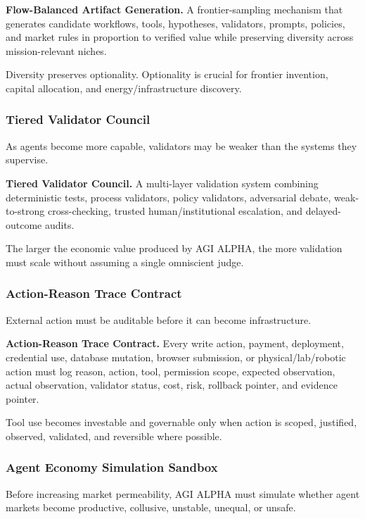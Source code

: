 \textbf{Flow-Balanced Artifact Generation.} A frontier-sampling
mechanism that generates candidate workflows, tools, hypotheses,
validators, prompts, policies, and market rules in proportion to
verified value while preserving diversity across mission-relevant
niches.

Diversity preserves optionality. Optionality is crucial for frontier
invention, capital allocation, and energy/infrastructure discovery.

\subsubsection{Tiered Validator Council}\label{tiered-validator-council}

As agents become more capable, validators may be weaker than the systems
they supervise.

\textbf{Tiered Validator Council.} A multi-layer validation system
combining deterministic tests, process validators, policy validators,
adversarial debate, weak-to-strong cross-checking, trusted
human/institutional escalation, and delayed-outcome audits.

The larger the economic value produced by AGI ALPHA, the more validation
must scale without assuming a single omniscient judge.

\subsubsection{Action-Reason Trace
Contract}\label{action-reason-trace-contract}

External action must be auditable before it can become infrastructure.

\textbf{Action-Reason Trace Contract.} Every write action, payment,
deployment, credential use, database mutation, browser submission, or
physical/lab/robotic action must log reason, action, tool, permission
scope, expected observation, actual observation, validator status, cost,
risk, rollback pointer, and evidence pointer.

Tool use becomes investable and governable only when action is scoped,
justified, observed, validated, and reversible where possible.

\subsubsection{Agent Economy Simulation
Sandbox}\label{agent-economy-simulation-sandbox}

Before increasing market permeability, AGI ALPHA must simulate whether
agent markets become productive, collusive, unstable, unequal, or
unsafe.


